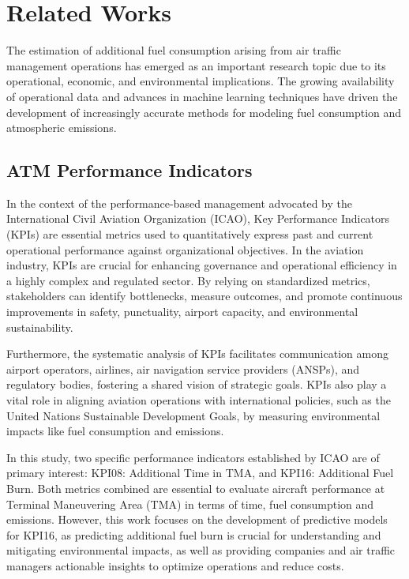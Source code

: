 \section{Related Works}
\label{sec:related_works}

The estimation of additional fuel consumption arising from air traffic management operations has emerged as an important research topic due to its operational, economic, and environmental implications. The growing availability of operational data and advances in machine learning techniques have driven the development of increasingly accurate methods for modeling fuel consumption and atmospheric emissions.

\subsection{ATM Performance Indicators}
In the context of the performance-based management advocated by the International Civil Aviation Organization (ICAO), Key Performance Indicators (KPIs) are essential metrics used to quantitatively express past and current operational performance against organizational objectives. In the aviation industry, KPIs are crucial for enhancing governance and operational efficiency in a highly complex and regulated sector. By relying on standardized metrics, stakeholders can identify bottlenecks, measure outcomes, and promote continuous improvements in safety, punctuality, airport capacity, and environmental sustainability.

Furthermore, the systematic analysis of KPIs facilitates communication among airport operators, airlines, air navigation service providers (ANSPs), and regulatory bodies, fostering a shared vision of strategic goals. KPIs also play a vital role in aligning aviation operations with international policies, such as the United Nations Sustainable Development Goals, by measuring environmental impacts like fuel consumption and emissions.

In this study, two specific performance indicators established by ICAO are of primary interest: KPI08: Additional Time in TMA, and KPI16: Additional Fuel Burn. Both metrics combined are essential to evaluate aircraft performance at Terminal Maneuvering Area (TMA) in terms of time, fuel consumption and emissions. However, this work focuses on the development of predictive models for KPI16, as predicting additional fuel burn is crucial for understanding and mitigating environmental impacts, as well as providing companies and air traffic managers actionable insights to optimize operations and reduce costs.

